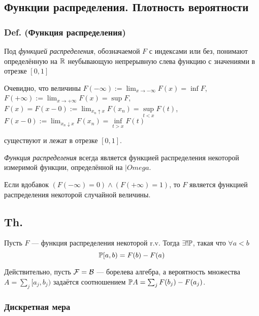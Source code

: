\subsection{Функции распределения. Плотность
вероятности}\label{ux444ux443ux43dux43aux446ux438ux438-ux440ux430ux441ux43fux440ux435ux434ux435ux43bux435ux43dux438ux44f.-ux43fux43bux43eux442ux43dux43eux441ux442ux44c-ux432ux435ux440ux43eux44fux442ux43dux43eux441ux442ux438}

\subsubsection{Def. (Функция
распределения)}\label{def.-ux444ux443ux43dux43aux446ux438ux44f-ux440ux430ux441ux43fux440ux435ux434ux435ux43bux435ux43dux438ux44f}

Под \emph{функцией распределения}, обозначаемой \(F\) с индексами или
без, понимают определённую на \(\mathbb R\) неубывающую непрерывную слева
функцию с значениями в отрезке \([0,1]\)

Очевидно, что величины
\(F(-\infty) := \lim_{x\to -\infty} F(x) = \inf F\),
\(F(+\infty) := \lim_{x\to +\infty} F(x) = \sup F\),
\(F(x) = F(x - 0) := \lim_{x_n\uparrow x} F(x_n) = \sup\limits_{t<x} F(t)\),
\(F(x - 0) := \lim_{x_n\downarrow x} F(x_n) = \inf\limits_{t>x} F(t)\)

существуют и лежат в отрезке \([0,1]\).

\emph{Функция распределения} всегда является функцией распределения
некоторой измеримой функции, определённой на \(|Omega\).

Если вдобавок \((F(-\infty) = 0) \land (F(+\infty) = 1)\), то \(F\)
является функцией распределения некоторой случайной величины.

\subsection{Th.}\label{th.}

Пусть \(F\) --- функция распределения некоторой r.v. Тогда
\(\exists! \mathbb P\), такая что \(\forall a<b\) \[\mathbb P [a,b) = F(b) - F(a)\]

Действительно, пусть \(\mathcal F = \mathcal B\) --- борелева алгебра, а вероятность
множества \(A = \sum_j [a_j,b_j)\) задаётся соотношением
\(\mathbb P A = \sum_j F(b_j) - F(a_j)\).

\subsubsection{Дискретная
мера}\label{ux434ux438ux441ux43aux440ux435ux442ux43dux430ux44f-ux43cux435ux440ux430}

